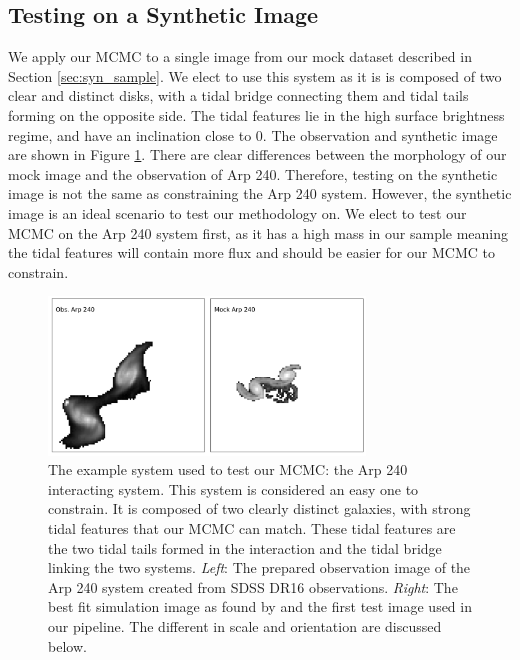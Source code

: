 \subsection{Testing on a Synthetic Image}
We apply our MCMC to a single image from our mock dataset described in Section \ref{sec:syn_sample}. We elect to use this system as it is is composed of two clear and distinct disks, with a tidal bridge connecting them and tidal tails forming on the opposite side. The tidal features lie in the high surface brightness regime, and have an inclination close to 0. The observation and synthetic image are shown in Figure \ref{fig:arp240}. There are clear differences between the morphology of our mock image and the observation of Arp 240. Therefore, testing on the synthetic image is not the same as constraining the Arp 240 system. However, the synthetic image is an ideal scenario to test our methodology on. We elect to test our MCMC on the Arp 240 system first, as it has a high mass in our sample meaning the tidal features will contain more flux and should be easier for our MCMC to constrain.

\begin{figure}
\centering
\includegraphics[width=0.75\textwidth]{Chapter1/figures/arp240-obs-sim.pdf}
\caption[The example system used to test our MCMC: the Arp 240 interacting system.]{The example system used to test our MCMC: the Arp 240 interacting system. This system is considered an easy one to constrain. It is composed of two clearly distinct galaxies, with strong tidal features that our MCMC can match. These tidal features are the two tidal tails formed in the interaction and the tidal bridge linking the two systems. \textit{Left}: The prepared observation image of the Arp 240 system created from SDSS DR16 observations. \textit{Right}: The best fit simulation image as found by \citet{2016MNRAS.459..720H} and the first test image used in our pipeline. The different in scale and orientation are discussed below.}
\label{fig:arp240}
\end{figure}

